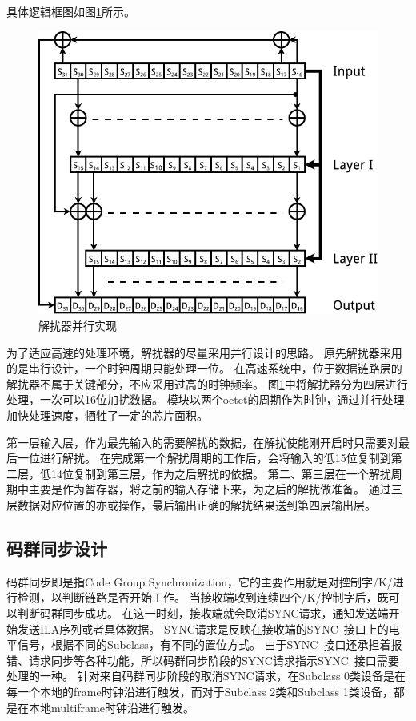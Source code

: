 \documentclass[UTF8]{ctexart}
\begin{document}
具体逻辑框图如图\ref{fig:scrambler_descrambler_parallel_implementation}所示。

\begin{figure}[H]
\centering
\includegraphics[width=18cm]{./img/scrambler_descrambler_parallel_implementation.pdf}
\caption{解扰器并行实现}
\label{fig:scrambler_descrambler_parallel_implementation}
\end{figure}

为了适应高速的处理环境，解扰器的尽量采用并行设计的思路。
原先解扰器采用的是串行设计，一个时钟周期只能处理一位。
在高速系统中，位于数据链路层的解扰器不属于关键部分，不应采用过高的时钟频率。
图\ref{fig:scrambler_descrambler_parallel_implementation}中将解扰器分为四层进行处理，一次可以16位加扰数据。
模块以两个octet的周期作为时钟，通过并行处理加快处理速度，牺牲了一定的芯片面积。

第一层输入层，作为最先输入的需要解扰的数据，在解扰使能刚开启时只需要对最后一位进行解扰。
在完成第一个解扰周期的工作后，会将输入的低15位复制到第二层，低14位复制到第三层，作为之后解扰的依据。
第二、第三层在一个解扰周期中主要是作为暂存器，将之前的输入存储下来，为之后的解扰做准备。
通过三层数据对应位置的亦或操作，最后输出正确的解扰结果送到第四层输出层。

\subsection{码群同步设计}

码群同步即是指Code Group Synchronization，它的主要作用就是对控制字/K/进行检测，以判断链路是否开始工作。
当接收端收到连续四个/K/控制字后，既可以判断码群同步成功。
在这一时刻，接收端就会取消SYNC请求，通知发送端开始发送ILA序列或者具体数据。
SYNC请求是反映在接收端的SYNC~接口上的电平信号，根据不同的Subclass，有不同的置位方式。
由于SYNC~接口还承担着报错、请求同步等各种功能，所以码群同步阶段的SYNC请求指示SYNC~接口需要处理的一种。
针对来自码群同步阶段的取消SYNC请求，在Subclass 0类设备是在每一个本地的frame时钟沿进行触发，而对于Subclass 2类和Subclass 1类设备，都是在本地multiframe时钟沿进行触发。
\end{document}
